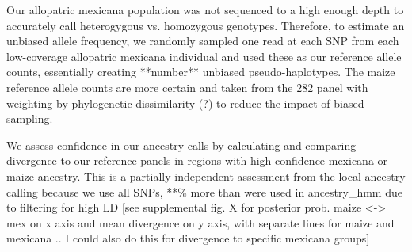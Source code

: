 \documentclass[12pt]{report}
\begin{document}
Our allopatric mexicana population was not sequenced to a high enough depth to accurately call heterogygous vs. homozygous genotypes. Therefore, to estimate an unbiased allele frequency, we randomly sampled one read at each SNP from each low-coverage allopatric mexicana individual and used these as our reference allele counts, essentially creating **number** unbiased pseudo-haplotypes. The maize reference allele counts are more certain and taken from the 282 panel with weighting by phylogenetic dissimilarity (?) to reduce the impact of biased sampling.\par

We assess confidence in our ancestry calls by calculating and comparing divergence to our reference panels in regions with high confidence mexicana or maize ancestry. This is a partially independent assessment from the local ancestry calling because we use all SNPs, **\% more than were used in ancestry\_hmm due to filtering for high LD [see supplemental fig. X for posterior prob. maize <-> mex on x axis and mean divergence on y axis, with separate lines for maize and mexicana .. I could also do this for divergence to specific mexicana groups] \par
\end{document}
